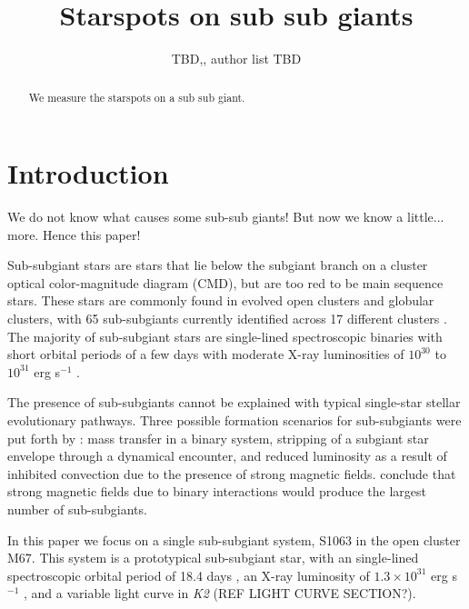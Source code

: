 \documentclass[twocolumn]{emulateapj}%
\begin{document}
\title{Starspots on sub sub giants }

\author{TBD,, author list TBD}



\begin{abstract}

We measure the starspots on a sub sub giant.

\end{abstract}


\maketitle

\section{Introduction}\label{sec:intro}

We do not know what causes some sub-sub giants!
But now we know a little... more. Hence this paper!

Sub-subgiant stars are stars that lie below the subgiant branch on a cluster optical color-magnitude diagram (CMD), but are too red to be main sequence stars. These stars are commonly found in evolved open clusters and globular clusters, with 65 sub-subgiants currently identified across 17 different clusters \citep{geller17}. The majority of sub-subgiant stars are single-lined spectroscopic binaries with short orbital periods of a few days with moderate X-ray luminosities of $10^{30}$ to $10^{31}$ erg s$^{-1}$ \citep[and references therein]{geller17}.

The presence of sub-subgiants cannot be explained with typical single-star stellar evolutionary pathways. Three possible formation scenarios for sub-subgiants were put forth by \citet{leiner17}: mass transfer in a binary system, stripping of a subgiant star envelope through a dynamical encounter, and reduced luminosity as a result of inhibited convection due to the presence of strong magnetic fields. \citet{leiner17} conclude that strong magnetic fields due to binary interactions would produce the largest number of sub-subgiants.

In this paper we focus on a single sub-subgiant system, S1063 in the open cluster M67. This system is a prototypical sub-subgiant star, with an single-lined spectroscopic orbital period of 18.4 days \citep{geller17}, an X-ray luminosity of $1.3\times10^{31}$ erg s$^{-1}$ \citep{vandenberg99}, and a variable light curve in \textit{K2} (REF LIGHT CURVE SECTION?).
\end{document}
